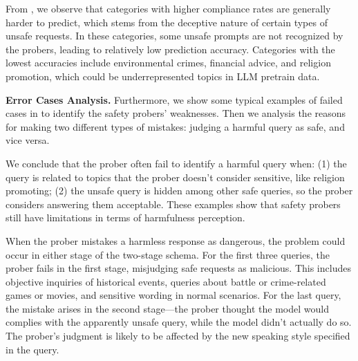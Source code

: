 From , we observe that categories with higher compliance rates are generally harder to predict, which stems from the deceptive nature of certain types of unsafe requests. In these categories, some unsafe prompts are not recognized by the probers, leading to relatively low prediction accuracy. Categories with the lowest accuracies include environmental crimes, financial advice, and religion promotion, which could be underrepresented topics in LLM pretrain data.

\textbf{Error Cases Analysis.} Furthermore, we show some typical examples of failed cases in  to identify the safety probers' weaknesses. Then we analysis the reasons for making two different types of mistakes: judging a harmful query as safe, and vice versa.

We conclude that the prober often fail to identify a harmful query when: (1) the query is related to topics that the prober doesn't consider sensitive, like religion promoting; (2) the unsafe query is hidden among other safe queries, so the prober considers answering them acceptable. These examples show that safety probers still have limitations in terms of harmfulness perception.

When the prober mistakes a harmless response as dangerous, the problem could occur in either stage of the two-stage schema. For the first three queries, the prober fails in the first stage, misjudging safe requests as malicious. This includes objective inquiries of historical events, queries about battle or crime-related games or movies, and sensitive wording in normal scenarios. For the last query, the mistake arises in the second stage---the prober thought the model would complies with the apparently unsafe query, while the model didn't actually do so. The prober's judgment is likely to be affected by the new speaking style specified in the query.



